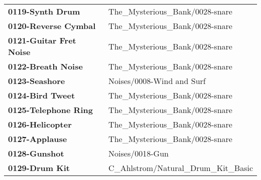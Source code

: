 \begin{longtable}{|l l|}
   \textbf{0119-Synth Drum} &
      The\_Mysterious\_Bank/0028-snare \\
   \textbf{0120-Reverse Cymbal} &
      The\_Mysterious\_Bank/0028-snare \\
   \textbf{0121-Guitar Fret Noise} &
      The\_Mysterious\_Bank/0028-snare \\
   \textbf{0122-Breath Noise} &
      The\_Mysterious\_Bank/0028-snare \\
   \textbf{0123-Seashore} &
      Noises/0008-Wind and Surf \\
   \textbf{0124-Bird Tweet} &
      The\_Mysterious\_Bank/0028-snare \\
   \textbf{0125-Telephone Ring} &
      The\_Mysterious\_Bank/0028-snare \\
   \textbf{0126-Helicopter} &
      The\_Mysterious\_Bank/0028-snare \\
   \textbf{0127-Applause} &
      The\_Mysterious\_Bank/0028-snare \\
   \textbf{0128-Gunshot} &
      Noises/0018-Gun \\
   \textbf{0129-Drum Kit} &
      C\_Ahlstrom/Natural\_Drum\_Kit\_Basic \\
\end{longtable}

